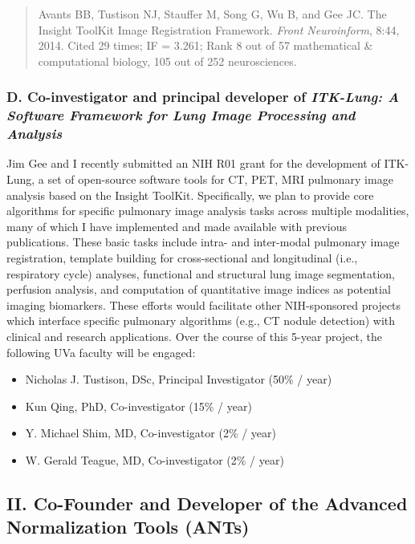 \documentclass[11pt,]{article}
\providecommand{\tightlist}{%
  \setlength{\itemsep}{0pt}\setlength{\parskip}{0pt}}
\begin{document}
\begin{quote}
Avants BB, Tustison NJ, Stauffer M, Song G, Wu B, and Gee JC. The
Insight ToolKit Image Registration Framework. \emph{Front Neuroinform},
8:44, 2014. Cited 29 times; IF = 3.261; Rank 8 out of 57 mathematical \&
computational biology, 105 out of 252 neurosciences.
\end{quote}

\subsubsection{\texorpdfstring{D. Co-investigator and principal
developer of \emph{ITK-Lung: A Software Framework for Lung Image
Processing and
Analysis}}{D. Co-investigator and principal developer of ITK-Lung: A Software Framework for Lung Image Processing and Analysis}}\label{d.-co-investigator-and-principal-developer-of-itk-lung-a-software-framework-for-lung-image-processing-and-analysis}

Jim Gee and I recently submitted an NIH R01 grant for the development of
ITK-Lung, a set of open-source software tools for CT, PET, MRI pulmonary
image analysis based on the Insight ToolKit. Specifically, we plan to
provide core algorithms for specific pulmonary image analysis tasks
across multiple modalities, many of which I have implemented and made
available with previous publications. These basic tasks include intra-
and inter-modal pulmonary image registration, template building for
cross-sectional and longitudinal (i.e., respiratory cycle) analyses,
functional and structural lung image segmentation, perfusion analysis,
and computation of quantitative image indices as potential imaging
biomarkers. These efforts would facilitate other NIH-sponsored projects
which interface specific pulmonary algorithms (e.g., CT nodule
detection) with clinical and research applications. Over the course of
this 5-year project, the following UVa faculty will be engaged:

\begin{itemize}
\tightlist
\item
  Nicholas J. Tustison, DSc, Principal Investigator (50\% / year)
\item
  Kun Qing, PhD, Co-investigator (15\% / year)
\item
  Y. Michael Shim, MD, Co-investigator (2\% / year)
\item
  W. Gerald Teague, MD, Co-investigator (2\% / year)
\end{itemize}

\subsection{II. Co-Founder and Developer of the Advanced Normalization
Tools
(ANTs)}\label{ii.-co-founder-and-developer-of-the-advanced-normalization-tools-ants}
\end{document}
